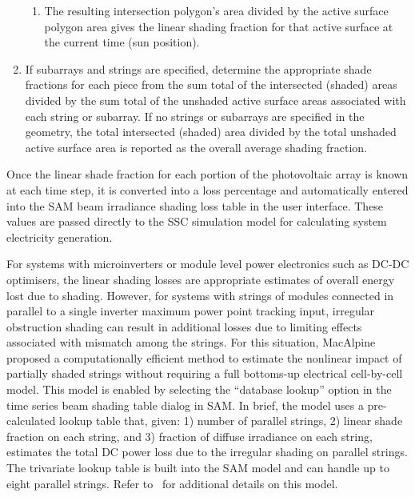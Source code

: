 \documentclass[12pt,letterpaper]{article}
\begin{document}
\begin{enumerate}
\begin{enumerate}
	\item The resulting intersection polygon's area divided by the active surface polygon area gives the linear shading fraction for that active surface at the current time (sun position).
	\end{enumerate}
\item If subarrays and strings are specified, determine the appropriate shade fractions for each piece from the sum total of the intersected (shaded) areas divided by the sum total of the unshaded active surface areas associated with each string or subarray.   If no strings or subarrays are specified in the geometry, the total intersected (shaded) area divided by the total unshaded active surface area is reported as the overall average shading fraction.
\end{enumerate}

Once the linear shade fraction for each portion of the photovoltaic array is known at each time step, it is converted into a loss percentage and automatically entered into the SAM beam irradiance shading loss table in the user interface. These values are passed directly to the SSC simulation model for calculating system electricity generation.

For systems with microinverters or module level power electronics such as DC-DC optimisers, the linear shading losses are appropriate estimates of overall energy lost due to shading.  However, for systems with strings of modules connected in parallel to a single inverter maximum power point tracking input, irregular obstruction shading can result in additional losses due to limiting effects associated with mismatch among the strings.  For this situation, MacAlpine~\cite{macalpine2015} proposed a computationally efficient method to estimate the nonlinear impact of partially shaded strings without requiring a full bottoms-up electrical cell-by-cell model.  This model is enabled by selecting the ``database lookup'' option in the time series beam shading table dialog in SAM.  In brief, the model uses a pre-calculated lookup table that, given: 1) number of parallel strings, 2) linear shade fraction on each string, and 3) fraction of diffuse irradiance on each string, estimates the total DC power loss due to the irregular shading on parallel strings.  The trivariate lookup table is built into the SAM model and can handle up to eight parallel strings.  Refer to~\cite{macalpine2015} for additional details on this model.
\end{document}
